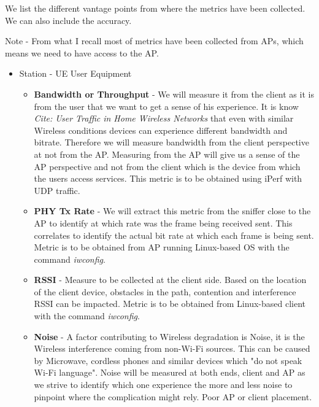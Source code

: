 We list the different vantage points from where the metrics have been collected. We can also include the accuracy.

Note - From what I recall most of metrics have been collected from APs, which means we need to have access to the AP.

\begin{itemize}
	\item Station - UE User Equipment 
	\begin{itemize}
		\item \textbf{Bandwidth or Throughput} - We will measure it from the client as it is from the user that we want to get a sense of his experience. It is know \emph{Cite: User Traffic in Home Wireless Networks} that even with similar Wireless conditions devices can experience different bandwidth and bitrate. Therefore we will measure bandwidth from the client perspective at not from the AP. Measuring from the AP will give us a sense of the AP perspective and not from the client which is the device from which the users access services. This metric is to be obtained using iPerf with UDP traffic.
		\item \textbf{PHY Tx Rate} - We will extract this metric from the sniffer close to the AP to identify at which rate was the frame being received sent. This correlates to identify the actual bit rate at which each frame is being sent. Metric is to be obtained from AP running Linux-based OS with the command \emph{iwconfig}.
		\item \textbf{RSSI} - Measure to be collected at the client side. Based on the location of the client device, obstacles in the path, contention and interference RSSI can be impacted. Metric is to be obtained from Linux-based client with the command \emph{iwconfig}.
		\item \textbf{Noise} - A factor contributing to Wireless degradation is Noise, it is the Wireless interference coming from non-Wi-Fi sources. This can be caused by Microwave, cordless phones and similar devices which "do not speak Wi-Fi language". Noise will be measured at both ends, client and AP as we strive to identify which one experience the more and less noise to pinpoint where the complication might rely. Poor AP or client placement.
		
	\end{itemize}
	

\end{itemize}
